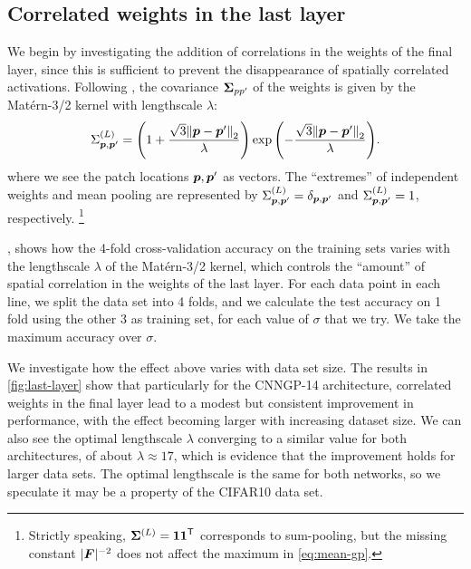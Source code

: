 \documentclass[accepted]{uai2021} %
\newcommand{\layersizebase}{\vF}
\newcommand{\priorWcovs}[1]{\Sigma^{(#1)}}
\newcommand{\priorWcov}[1]{\boldsymbol{\Sigma}^{(#1)}}
\newcommand{\patch}{\vp}               %
\newcommand{\0}{\boldsymbol{0}}
\newcommand{\1}{\boldsymbol{1}}
\begin{document}
\subsection{Correlated weights in the last layer}
We begin by investigating the addition of correlations in the weights of the final layer, since this is sufficient to prevent the disappearance of spatially correlated activations.  Following \citet{dutordoir2020}, the covariance ${\boldsymbol\Sigma}_{pp'}$ of the weights is given by the Matérn-3/2 kernel with lengthscale $\lambda$:
\begin{equation}
    \priorWcovs{L}_{\patch,\patch'} = \bra{1 + \frac{\sqrt{3}\bracket{\|}{\|}{\patch - \patch'}_2}{\lambda}} \exp\bra{-\frac{\sqrt{3}\bracket{\|}{\|}{\patch - \patch'}_2}{\lambda}}.
\end{equation}
where we see the patch locations $\patch,\patch'$ as vectors. The ``extremes''
of independent weights and mean pooling are represented by
$\priorWcovs{L}_{\patch,\patch'} = \delta_{\patch,\patch'}$ and
$\priorWcovs{L}_{\patch,\patch'} = 1$, respectively. \footnote{Strictly
  speaking, $\priorWcov{L} = {\boldsymbol 1\boldsymbol 1}^\tp$ corresponds to
  sum-pooling, but the missing constant $\absshort{\layersizebase}^{-2}$ does
  not affect the maximum in \cref{eq:mean-gp}.}

, shows how the 4-fold cross-validation accuracy on the training sets varies with the lengthscale $\lambda$ of the Matérn-3/2 kernel, which controls the ``amount'' of spatial correlation in the weights of the last layer. For each data point in each line, we split the data set into 4 folds, and we calculate the test accuracy on 1 fold using the other 3 as training set, for each value of $\sigma$ that we try. We take the maximum accuracy over $\sigma$.

We investigate how the effect above varies with data set size. The results in \cref{fig:last-layer} show that particularly for the CNNGP-14 architecture, correlated weights in the final layer lead to a modest but consistent improvement in performance, with the effect becoming larger with increasing dataset size. We can also see the optimal lengthscale $\lambda$  converging to a similar value for both architectures, of about $\lambda \approx 17$, which is evidence that the improvement holds for larger data sets. The optimal lengthscale is the same for both networks, so we speculate it may be a property of the {CIFAR10} data set.
\end{document}
